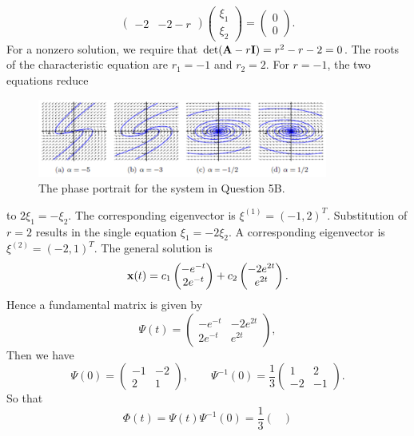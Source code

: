 \documentclass[11pt,a4paper]{article}
\begin{document}
\begin{enumerate}
$$\begin{pmatrix}
			-2 & -2-r
		\end{pmatrix}
		\begin{pmatrix}
			\xi_1\\
			\xi_2
		\end{pmatrix} =
		\begin{pmatrix}
			0\\
			0
		\end{pmatrix}.
		$$
		For a nonzero solution, we require that $\det(\vb{A} - r\vb{I}) = r^2 - r - 2 = 0$. The roots of the characteristic equation are $r_1 = -1$ and $r_2 = 2$. For $r = -1$, the two equations reduce
		\begin{figure}[H]
			\centering
			\includegraphics[width=0.85\textwidth]{figure/4_fig2.PNG}
			\caption{The phase portrait for the system in Question 5B.}
		\end{figure}
		to $2\xi_1 = -\xi_2$. The corresponding eigenvector is $\xi^{(1)} = (−1, 2)^T$. Substitution of $r = 2$ results in the single equation $\xi_1 = -2\xi_2$. A corresponding eigenvector is $\xi^{(2)} = (-2, 1)^T$. The general solution is
		$$
		\vb{x}(t) = c_1
		\begin{pmatrix}
			-e^{-t}\\
			2e^{-t}
		\end{pmatrix} + c_2
		\begin{pmatrix}
			-2e^{2t}\\
			e^{2t}
		\end{pmatrix}.
		$$
		Hence a fundamental matrix is given by
		$$
		\Psi (t) =
		\begin{pmatrix}
			-e^{-t} & -2e^{2t}\\
			2e^{-t} & e^{2t}
		\end{pmatrix},
		$$
		Then we have
		$$
		\Psi(0) =
		\begin{pmatrix}
			-1 & -2\\
			2 & 1
		\end{pmatrix},\qquad \Psi^{-1}(0) = \frac{1}{3}
		\begin{pmatrix}
			1 & 2\\
			-2 & -1
		\end{pmatrix}.
		$$
		So that
		$$
		\Phi(t) = \Psi(t)\Psi^{-1}(0) = \frac{1}{3}
		\begin{pmatrix}

\end{pmatrix}$$
\end{enumerate}
\end{document}
